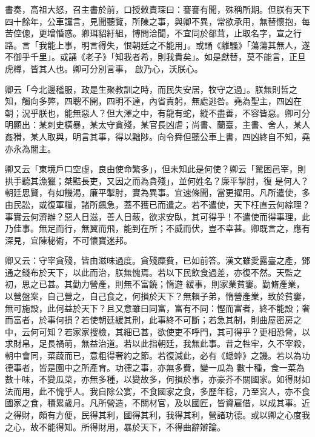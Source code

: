 \begin{pinyinscope}
 書奏，高祖大怒，召主書於前，口授敕責琛曰：謇謇有聞，殊稱所期。但朕有天下四十餘年，公車讜言，見聞聽覽，所陳之事，與卿不異，常欲承用，無替懷抱，每苦倥傯，更增惛惑。卿珥貂紆組，博問洽聞，不宜同於郤茸，止取名字，宣之行路。言「我能上事，明言得失，恨朝廷之不能用」。或誦《離騷》「蕩蕩其無人，遂不御乎千里」。或誦《老子》「知我者希，則我貴矣」。如是獻替，莫不能言，正旦虎樽，皆其人也。卿可分別言事，
 啟乃心，沃朕心。



 卿云「今北邊稽服，政是生聚教訓之時，而民失安居，牧守之過」。朕無則哲之知，觸向多弊，四聰不開，四明不達，內省責躬，無處逃咎。堯為聖主，四凶在朝；況乎朕也，能無惡人？但大澤之中，有龍有蛇，縱不盡善，不容皆惡。卿可分明顯出：某刺史橫暴，某太守貪殘，某官長凶虐；尚書、蘭臺，主書、舍人，某人姦猾，某人取與，明言其事，得以黜陟。向令舜但聽公車上書，四凶終自不知，堯亦永為闇主。



 卿又云「東境戶口空虛，良由使命繁多」，但未知此是何使？卿云「駑困邑宰，則拱手聽其漁獵；桀黠長吏，又因之而為貪殘」，並何姓名？廉平掣肘，復
 是何人？朝廷思賢，有如饑渴，廉平掣肘，實為異事。宜速條聞，當更擢用。凡所遣使，多由民訟，或復軍糧，諸所飆急，蓋不獲已而遣之。若不遣使，天下枉直云何綜理？事實云何濟辦？惡人日滋，善人日蔽，欲求安臥，其可得乎！不遣使而得事理，此乃佳事。無足而行，無翼而飛，能到在所；不威而伏，豈不幸甚。卿既言之，應有深見，宜陳秘術，不可懷寶迷邦。



 卿又云：守宰貪殘，皆由滋味過度。貪殘糜費，已如前答。漢文雖愛露臺之產，鄧通之錢布於天下，以此而治，朕無愧焉。若以下民飲食過差，亦復不然。天監之初，思之已甚。其勤力營產，則無不富饒；惰遊
 緩事，則家業貧窶。勤脩產業，以營盤案，自己營之，自己食之，何損於天下？無賴子弟，惰營產業，致於貧窶，無可施設，此何益於天下？且又意雖曰同富，富有不同：慳而富者，終不能設；奢而富者，於事何損？若使朝廷緩其刑，此事終不可斷；若急其制，則曲屋密房之中，云何可知？若家家搜檢，其細已甚，欲使吏不呼門，其可得乎？更相恐脅，以求財帛，足長禍萌，無益治道。若以此指朝廷，我無此事。昔之牲牢，久不宰殺，朝中會同，菜蔬而已，意粗得奢約之節。若復減此，必有《蟋蟀》之譏。若以為功德事者，皆是園中之所產育。功德之事，亦無多費，變一瓜為
 數十種，食一菜為數十味，不變瓜菜，亦無多種，以變故多，何損於事，亦豪芥不關國家。如得財如法而用，此不愧乎人。我自除公宴，不食國家之食，多歷年稔，乃至宮人，亦不食國家之食，積累歲月。凡所營造，不關材官，及以國匠，皆資雇借，以成其事。近之得財，頗有方便，民得其利，國得其利，我得其利，營諸功德。或以卿之心度我之心，故不能得知。所得財用，暴於天下，不得曲辭辯論。




\end{pinyinscope}
